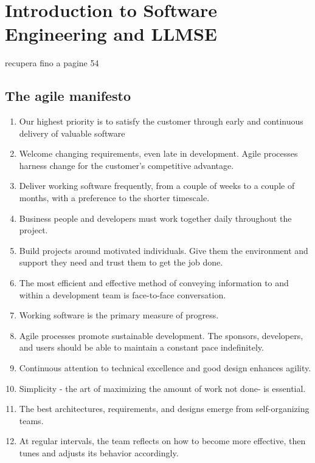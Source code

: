 \chapter{Introduction to Software Engineering and LLMSE}

recupera fino a pagine 54


\section{The agile manifesto}


\begin{enumerate}
  \item Our highest priority is to satisfy the customer through early and
        continuous delivery of valuable software
  \item Welcome changing requirements, even late in development. Agile
        processes harness change for the customer's competitive advantage.
  \item Deliver working software frequently, from a couple of weeks to a
        couple of months, with a preference to the shorter timescale.
  \item Business people and developers must work together daily
        throughout the project.
  \item Build projects around motivated individuals. Give them the environment
        and support they need and trust them to get the job done.
  \item The most efficient and effective method of conveying information to and
        within a development team is face-to-face conversation.
  \item Working software is the primary measure of progress.
  \item Agile processes promote sustainable development. The sponsors,
        developers, and users should be able to maintain a constant pace
        indefinitely.

  \item Continuous attention to technical excellence and good design
        enhances agility.
  \item Simplicity - the art of maximizing the amount of work not done- is
        essential.
  \item The best architectures, requirements, and designs emerge from
        self-organizing teams.
  \item At regular intervals, the team reflects on how to become more
        effective, then tunes and adjusts its behavior accordingly.
\end{enumerate}

